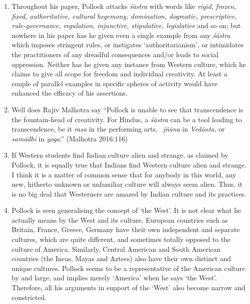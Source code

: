 \begin{enumerate}
\item Throughout his paper, Pollock attacks {\it śāstra} with words like \textsl{rigid, frozen, fixed, authoritative, cultural hegemony, domination, dogmatic, prescriptive, rule-governance, regulation, injunctive, stipulative, legislative} and so on; but nowhere in his paper has he given even a single example from any {\it śāstra} which imposes stringent rules, or instigates `authoritarianism', or intimidates the practitioners of any dreadful consequences and/or leads to social oppression. Neither has he given any instance from Western culture, which he claims to give all scope for freedom and individual creativity. At least a couple of parallel examples in specific spheres of activity would have enhanced the efficacy of his assertions.

\item Well does Rajiv Malhotra say ``Pollock is unable to see that transcendence is the fountain-head of creativity. For Hindus, a {\it śāstra} can be a tool leading to transcendence, be it {\it rasa} in the performing arts, \ {\it jñāna} in {\it Vedānta}, or {\it samādhi} in {\it yoga}.'' (Malhotra 2016:116)

\item If Western students find Indian culture alien and strange, as claimed by Pollock, it is equally true that Indians find Western culture alien and strange. I think it is a matter of common sense that for anybody in this world, any new, hitherto unknown or unfamiliar culture will always seem alien. Thus, it is no big deal that Westerners are amazed by Indian culture and its practices.

\item Pollock is seen generalising the concept of `the West'. It is not clear what he actually means by the West and its culture. European countries such as Britain, France, Greece, Germany have their own independent and separate cultures, which are quite different, and sometimes totally opposed to the culture of America. Similarly, Central American and South American countries (the Incas, Mayas and Aztecs) also have their own distinct and unique cultures. Pollock seems to be a representative of the American culture by and large, and implies merely `America' when he says `the West'. Therefore, all his arguments in support of the `West' also become narrow and constricted. 
\end{enumerate}

